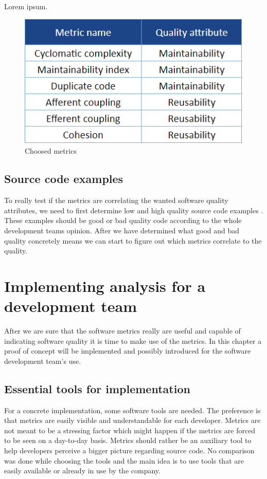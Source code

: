 Lorem ipsum.

\begin{figure}[t!]
\centering
\includegraphics[scale=0.8]{metrics.png}
\caption{Choosed metrics}
\label{fig:metrics}
\end{figure}

\section{Source code examples}
To really test if the metrics are correlating the wanted software quality attributes, we need to first determine low and high quality source code examples \cite{coleman1994using}. These examples should be good or bad quality code according to the whole development teams opinion. After we have determined what good and bad quality concretely means we can start to figure out which metrics correlate to the quality. 




\chapter{Implementing analysis for a development team}

After we are sure that the software metrics really are useful and capable of indicating software quality it is time to make use of the metrics. In this chapter a proof of concept will be implemented and possibly introduced for the software development team's use.

\section{Essential tools for implementation}

For a concrete implementation, some software tools are needed. The preference is that metrics are easily visible and understandable for each developer. Metrics are not meant to be a stressing factor which might happen if the metrics are forced to be seen on a day-to-day basis. Metrics should rather be an auxiliary tool to help developers perceive a bigger picture regarding source code. No comparison was done while choosing the tools and the main idea is to use tools that are easily available or already in use by the company.

